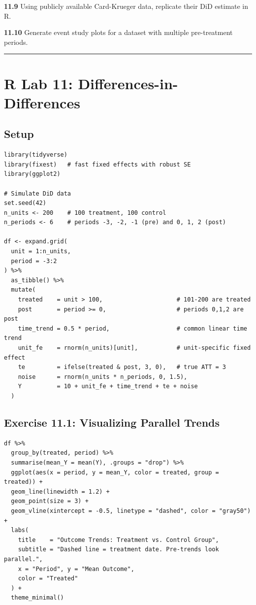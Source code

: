 \textbf{11.9} Using publicly available Card-Krueger data, replicate their DiD estimate in R.

\textbf{11.10} Generate event study plots for a dataset with multiple pre-treatment periods.

\medskip\hrule\medskip

\section{R Lab 11: Differences-in-Differences}

\subsection{Setup}

\begin{lstlisting}
library(tidyverse)
library(fixest)   # fast fixed effects with robust SE
library(ggplot2)

# Simulate DiD data
set.seed(42)
n_units <- 200    # 100 treatment, 100 control
n_periods <- 6    # periods -3, -2, -1 (pre) and 0, 1, 2 (post)

df <- expand.grid(
  unit = 1:n_units,
  period = -3:2
) %>%
  as_tibble() %>%
  mutate(
    treated    = unit > 100,                     # 101-200 are treated
    post       = period >= 0,                    # periods 0,1,2 are post
    time_trend = 0.5 * period,                   # common linear time trend
    unit_fe    = rnorm(n_units)[unit],           # unit-specific fixed effect
    te         = ifelse(treated & post, 3, 0),   # true ATT = 3
    noise      = rnorm(n_units * n_periods, 0, 1.5),
    Y          = 10 + unit_fe + time_trend + te + noise
  )
\end{lstlisting}

\subsection{Exercise 11.1: Visualizing Parallel Trends}

\begin{lstlisting}
df %>%
  group_by(treated, period) %>%
  summarise(mean_Y = mean(Y), .groups = "drop") %>%
  ggplot(aes(x = period, y = mean_Y, color = treated, group = treated)) +
  geom_line(linewidth = 1.2) +
  geom_point(size = 3) +
  geom_vline(xintercept = -0.5, linetype = "dashed", color = "gray50") +
  labs(
    title    = "Outcome Trends: Treatment vs. Control Group",
    subtitle = "Dashed line = treatment date. Pre-trends look parallel.",
    x = "Period", y = "Mean Outcome",
    color = "Treated"
  ) +
  theme_minimal()
\end{lstlisting}

